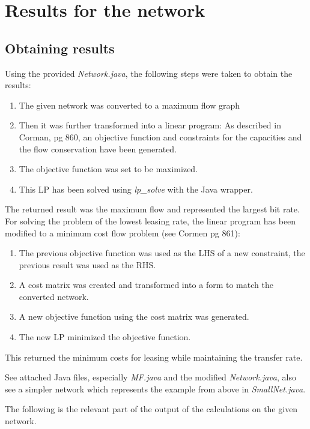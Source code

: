 \documentclass{article}
\begin{document}
\section*{Results for the network}
\subsection*{Obtaining results}
Using the provided \emph{Network.java}, the following steps were taken to obtain the results:
\begin{enumerate}
\item The given network was converted to a maximum flow graph
\item Then it was further transformed into a linear program: As described in Corman, pg 860, an objective function and constraints for the capacities and the flow conservation have been generated.
\item The objective function was set to be maximized.
\item This LP has been solved using \emph{lp\_solve} with the Java wrapper. 
\end{enumerate}
The returned result was the maximum flow and represented the largest bit rate. For solving the problem of the lowest leasing rate, the linear program has been modified to a minimum cost flow problem (see Cormen pg 861):
\begin{enumerate}
\item The previous objective function was used as the LHS of a new constraint, the previous result was used as the RHS.
\item A cost matrix was created and transformed into a form to match the converted network.
\item A new objective function using the cost matrix was generated.
\item The new LP minimized the objective function.
\end{enumerate}
This returned the minimum costs for leasing while maintaining the transfer rate. 

See attached Java files, especially \emph{MF.java} and the modified \emph{Network.java}, also see a simpler network which represents the example from above in \emph{SmallNet.java}. 

The following is the relevant part of the output of the calculations on the given network.
\end{document}
